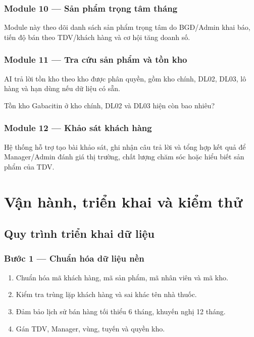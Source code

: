 \documentclass[12pt,a4paper,oneside,openany]{book}
\newcommand{\prompt}[1]{\begin{tcolorbox}[codeBox]#1\end{tcolorbox}}
\begin{document}
\section{Module 10 — Sản phẩm trọng tâm tháng}
Module này theo dõi danh sách sản phẩm trọng tâm do BGĐ/Admin khai báo, tiến độ bán theo TDV/khách hàng và cơ hội tăng doanh số.

\section{Module 11 — Tra cứu sản phẩm và tồn kho}
AI trả lời tồn kho theo kho được phân quyền, gồm kho chính, DL02, DL03, lô hàng và hạn dùng nếu dữ liệu có sẵn.

\prompt{Tồn kho Gabacitin ở kho chính, DL02 và DL03 hiện còn bao nhiêu?}

\section{Module 12 — Khảo sát khách hàng}
Hệ thống hỗ trợ tạo bài khảo sát, ghi nhận câu trả lời và tổng hợp kết quả để Manager/Admin đánh giá thị trường, chất lượng chăm sóc hoặc hiểu biết sản phẩm của TDV.

\part{Vận hành, triển khai và kiểm thử}

\chapter{Quy trình triển khai dữ liệu}

\section{Bước 1 — Chuẩn hóa dữ liệu nền}
\begin{enumerate}
  \item Chuẩn hóa mã khách hàng, mã sản phẩm, mã nhân viên và mã kho.
  \item Kiểm tra trùng lặp khách hàng và sai khác tên nhà thuốc.
  \item Đảm bảo lịch sử bán hàng tối thiểu 6 tháng, khuyến nghị 12 tháng.
  \item Gán TDV, Manager, vùng, tuyến và quyền kho.
\end{enumerate}
\end{document}
